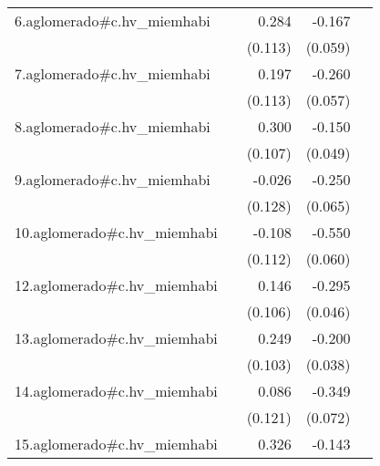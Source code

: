 {\begin{longtable}{l*{4}{D{.}{.}{-1}}}
\addlinespace
6.aglomerado#c.hv\_miemhabi&                     &       0.284\sym{*}  &      -0.167\sym{**} &                     \\
            &                     &     (0.113)         &     (0.059)         &                     \\
\addlinespace
7.aglomerado#c.hv\_miemhabi&                     &       0.197         &      -0.260\sym{***}&                     \\
            &                     &     (0.113)         &     (0.057)         &                     \\
\addlinespace
8.aglomerado#c.hv\_miemhabi&                     &       0.300\sym{**} &      -0.150\sym{**} &                     \\
            &                     &     (0.107)         &     (0.049)         &                     \\
\addlinespace
9.aglomerado#c.hv\_miemhabi&                     &      -0.026         &      -0.250\sym{***}&                     \\
            &                     &     (0.128)         &     (0.065)         &                     \\
\addlinespace
10.aglomerado#c.hv\_miemhabi&                     &      -0.108         &      -0.550\sym{***}&                     \\
            &                     &     (0.112)         &     (0.060)         &                     \\
\addlinespace
12.aglomerado#c.hv\_miemhabi&                     &       0.146         &      -0.295\sym{***}&                     \\
            &                     &     (0.106)         &     (0.046)         &                     \\
\addlinespace
13.aglomerado#c.hv\_miemhabi&                     &       0.249\sym{*}  &      -0.200\sym{***}&                     \\
            &                     &     (0.103)         &     (0.038)         &                     \\
\addlinespace
14.aglomerado#c.hv\_miemhabi&                     &       0.086         &      -0.349\sym{***}&                     \\
            &                     &     (0.121)         &     (0.072)         &                     \\
\addlinespace
15.aglomerado#c.hv\_miemhabi&                     &       0.326\sym{**} &      -0.143         &                     \\

\end{longtable}}
